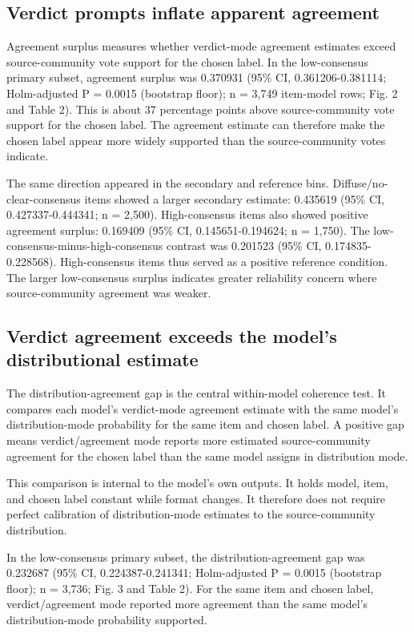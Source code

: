\documentclass[11pt]{article}
\begin{document}
\subsection{Verdict prompts inflate apparent agreement}

Agreement surplus measures whether verdict-mode agreement estimates exceed source-community vote support for the chosen label. In the low-consensus primary subset, agreement surplus was 0.370931 (95\% CI, 0.361206-0.381114; Holm-adjusted P = 0.0015 (bootstrap floor); n = 3,749 item-model rows; Fig. 2 and Table 2). This is about 37 percentage points above source-community vote support for the chosen label. The agreement estimate can therefore make the chosen label appear more widely supported than the source-community votes indicate.

The same direction appeared in the secondary and reference bins. Diffuse/no-clear-consensus items showed a larger secondary estimate: 0.435619 (95\% CI, 0.427337-0.444341; n = 2,500). High-consensus items also showed positive agreement surplus: 0.169409 (95\% CI, 0.145651-0.194624; n = 1,750). The low-consensus-minus-high-consensus contrast was 0.201523 (95\% CI, 0.174835-0.228568). High-consensus items thus served as a positive reference condition. The larger low-consensus surplus indicates greater reliability concern where source-community agreement was weaker.

\subsection{Verdict agreement exceeds the model's distributional estimate}

The distribution-agreement gap is the central within-model coherence test. It compares each model's verdict-mode agreement estimate with the same model's distribution-mode probability for the same item and chosen label. A positive gap means verdict/agreement mode reports more estimated source-community agreement for the chosen label than the same model assigns in distribution mode.

This comparison is internal to the model's own outputs. It holds model, item, and chosen label constant while format changes. It therefore does not require perfect calibration of distribution-mode estimates to the source-community distribution.

In the low-consensus primary subset, the distribution-agreement gap was 0.232687 (95\% CI, 0.224387-0.241341; Holm-adjusted P = 0.0015 (bootstrap floor); n = 3,736; Fig. 3 and Table 2). For the same item and chosen label, verdict/agreement mode reported more agreement than the same model's distribution-mode probability supported.
\end{document}
